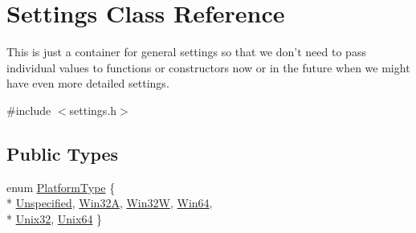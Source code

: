 \hypertarget{class_settings}{\section{Settings Class Reference}
\label{class_settings}
}


This is just a container for general settings so that we don't need to pass individual values to functions or constructors now or in the future when we might have even more detailed settings.  




{\ttfamily \#include $<$settings.\-h$>$}

\subsection*{Public Types}
\begin{DoxyCompactItemize}
\item 
enum \hyperlink{class_settings_a7c94920f2160a5cf261ce822a0ce2ee8}{Platform\-Type} \{ \\*
\hyperlink{class_settings_a7c94920f2160a5cf261ce822a0ce2ee8aa3320665aa07f8cf0e0e0751ceb91ecc}{Unspecified}, 
\hyperlink{class_settings_a7c94920f2160a5cf261ce822a0ce2ee8a81deabfdd294abf8cdcce45fa11abf09}{Win32\-A}, 
\hyperlink{class_settings_a7c94920f2160a5cf261ce822a0ce2ee8ad7275558801ab7ec5d0a26f30472b40c}{Win32\-W}, 
\hyperlink{class_settings_a7c94920f2160a5cf261ce822a0ce2ee8af6ee9ca221451c054a86451f3ebda13f}{Win64}, 
\\*
\hyperlink{class_settings_a7c94920f2160a5cf261ce822a0ce2ee8aed8b9591ef84f44874240ed9d5fc2743}{Unix32}, 
\hyperlink{class_settings_a7c94920f2160a5cf261ce822a0ce2ee8ae53acedf6c642bf12bf0501f59813c52}{Unix64}
 \}
\end{DoxyCompactItemize}
